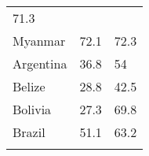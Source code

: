 \documentclass[]{book}
\begin{document}
\begin{longtable}[]{@{}lll@{}}
\begin{minipage}[t]{0.29\columnwidth}
71.3\strut
\end{minipage}\tabularnewline
\begin{minipage}[t]{0.29\columnwidth}\raggedright
Myanmar\strut
\end{minipage} & \begin{minipage}[t]{0.10\columnwidth}\raggedright
72.1\strut
\end{minipage} & \begin{minipage}[t]{0.29\columnwidth}\raggedright
72.3\strut
\end{minipage}\tabularnewline
\begin{minipage}[t]{0.29\columnwidth}\raggedright
Argentina\strut
\end{minipage} & \begin{minipage}[t]{0.10\columnwidth}\raggedright
36.8\strut
\end{minipage} & \begin{minipage}[t]{0.29\columnwidth}\raggedright
54\strut
\end{minipage}\tabularnewline
\begin{minipage}[t]{0.29\columnwidth}\raggedright
Belize\strut
\end{minipage} & \begin{minipage}[t]{0.10\columnwidth}\raggedright
28.8\strut
\end{minipage} & \begin{minipage}[t]{0.29\columnwidth}\raggedright
42.5\strut
\end{minipage}\tabularnewline
\begin{minipage}[t]{0.29\columnwidth}\raggedright
Bolivia\strut
\end{minipage} & \begin{minipage}[t]{0.10\columnwidth}\raggedright
27.3\strut
\end{minipage} & \begin{minipage}[t]{0.29\columnwidth}\raggedright
69.8\strut
\end{minipage}\tabularnewline
\begin{minipage}[t]{0.29\columnwidth}\raggedright
Brazil\strut
\end{minipage} & \begin{minipage}[t]{0.10\columnwidth}\raggedright
51.1\strut
\end{minipage} & \begin{minipage}[t]{0.29\columnwidth}\raggedright
63.2\strut
\end{minipage}\tabularnewline
\begin{minipage}[t]{0.29\columnwidth}\raggedright

\end{minipage}
\end{longtable}
\end{document}

